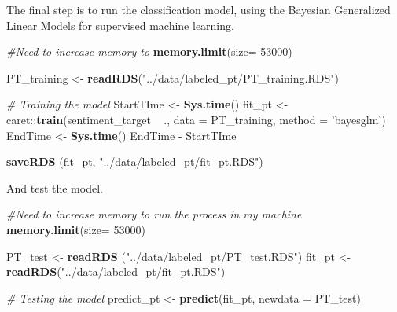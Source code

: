 \documentclass[]{article}
\newenvironment{Shaded}{\begin{snugshade}}{\end{snugshade}}
\newcommand{\KeywordTok}[1]{\textcolor[rgb]{0.13,0.29,0.53}{\textbf{{#1}}}}
\newcommand{\DataTypeTok}[1]{\textcolor[rgb]{0.13,0.29,0.53}{{#1}}}
\newcommand{\DecValTok}[1]{\textcolor[rgb]{0.00,0.00,0.81}{{#1}}}
\newcommand{\StringTok}[1]{\textcolor[rgb]{0.31,0.60,0.02}{{#1}}}
\newcommand{\CommentTok}[1]{\textcolor[rgb]{0.56,0.35,0.01}{\textit{{#1}}}}
\newcommand{\NormalTok}[1]{{#1}}
\begin{document}
The final step is to run the classification model, using the Bayesian
Generalized Linear Models for supervised machine learning.

\begin{Shaded}
\begin{Highlighting}[]
\CommentTok{#Need to increase memory to }
\KeywordTok{memory.limit}\NormalTok{(}\DataTypeTok{size=} \DecValTok{53000}\NormalTok{)    }

\NormalTok{PT_training <-}\StringTok{ }\KeywordTok{readRDS}\NormalTok{(}\StringTok{"../data/labeled_pt/PT_training.RDS"}\NormalTok{)}


\CommentTok{# Training the model}
\NormalTok{StartTIme <-}\StringTok{ }\KeywordTok{Sys.time}\NormalTok{()}
\NormalTok{fit_pt <-}\StringTok{ }\NormalTok{caret::}\KeywordTok{train}\NormalTok{(sentiment_target ~}\StringTok{ }\NormalTok{., }\DataTypeTok{data =} \NormalTok{PT_training, }\DataTypeTok{method =} \StringTok{'bayesglm'}\NormalTok{)}
\NormalTok{EndTime <-}\StringTok{ }\KeywordTok{Sys.time}\NormalTok{()}
\NormalTok{EndTime -}\StringTok{ }\NormalTok{StartTIme}


\KeywordTok{saveRDS} \NormalTok{(fit_pt, }\StringTok{"../data/labeled_pt/fit_pt.RDS"}\NormalTok{)}
\end{Highlighting}
\end{Shaded}

And test the model.

\begin{Shaded}
\begin{Highlighting}[]
\CommentTok{#Need to increase memory to run the process in my machine}
\KeywordTok{memory.limit}\NormalTok{(}\DataTypeTok{size=} \DecValTok{53000}\NormalTok{)    }

\NormalTok{PT_test <-}\StringTok{ }\KeywordTok{readRDS} \NormalTok{(}\StringTok{"../data/labeled_pt/PT_test.RDS"}\NormalTok{)}
\NormalTok{fit_pt <-}\StringTok{ }\KeywordTok{readRDS}\NormalTok{(}\StringTok{"../data/labeled_pt/fit_pt.RDS"}\NormalTok{)}



\CommentTok{# Testing the model}
\NormalTok{predict_pt <-}\StringTok{ }\KeywordTok{predict}\NormalTok{(fit_pt, }\DataTypeTok{newdata =} \NormalTok{PT_test)}
\end{Highlighting}
\end{Shaded}

\begin{Shaded}
\end{Shaded}
\end{document}

